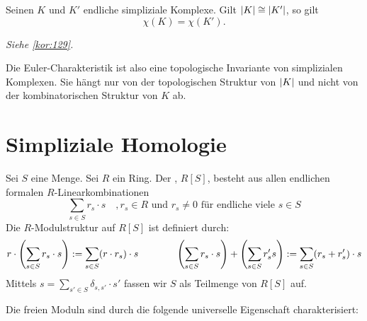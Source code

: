 \begin{satz}[{name=[die Eulercharakteristik ist eine topologische Invariante]}]
	Seinen $K$ und $K'$ endliche simpliziale Komplexe. 
	Gilt $\abs*{K} \cong \abs*{K'}$, so gilt 
	\[
		\chi(K)= \chi(K').
	\]
\end{satz}
\begin{beweis}
	\emph{Siehe \ref{kor:129}.}
\end{beweis}

Die Euler-Charakteristik ist also eine topologische Invariante von simplizialen Komplexen. 
Sie hängt nur von der topologischen Struktur von $\abs*{K}$ und nicht von der kombinatorischen Struktur von $K$ ab.

\newpage

\section{Simpliziale Homologie} %
\label{sec:3}

\begin{definition}[{name=[freier Modul]}]
	Sei $S$ eine Menge. Sei $R$ ein Ring. 
	Der , $R[S]$, besteht aus allen endlichen formalen $R$-Linearkombinationen
	\[
		\sum_{s \in S} r_s \cdot s \quad , r_s \in R \text{ und } r_s \not=0 \text{ für endliche viele }s \in S
	\]
	Die $R$-Modulstruktur auf $R[S]$ ist definiert durch:
	\begin{align*}
		r \cdot \enbrace*{\sum_{s\in S} r_s \cdot s} := \sum_{s \in S} (r \cdot r_s) \cdot s \qquad \qquad 
		\enbrace*{\sum_{s \in S} r_s \cdot s} + \enbrace*{\sum_{s \in S} r_s' s} := \sum_{s \in S} (r_s + r_s') \cdot s
	\end{align*}
	Mittels $s= \sum_{s' \in S} \delta_{s,s'} \cdot s'$ fassen wir $S$ als Teilmenge von $R[S]$ auf.
\end{definition}

Die freien Moduln sind durch die folgende universelle Eigenschaft charakterisiert:

